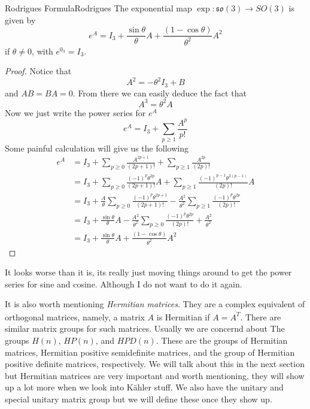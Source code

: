 \begin{boxprop}{Rodrigues Formula}{Rodrigues}
    The exponential map $\exp : \mathfrak{so}(3) \to SO(3)$ is given by
    \begin{equation*}
        e^A = I_3 + \frac{\sin \theta}{\theta}A + \frac{(1-\cos \theta)}{\theta^2}A^2
    \end{equation*}
    if $\theta \neq 0$, with $e^{0_3} = I_3$.

    \begin{proof}
        Notice that
        \begin{equation*}
            A^2 = -\theta^2 I_3 + B
        \end{equation*}
        and $AB=BA=0$.
        From there we can easily deduce the fact that
        \begin{equation*}
            A^3 = \theta^2A
        \end{equation*}
        Now we just write the power series for $e^A$
        \begin{equation*}
            e^A = I_3 + \sum_{p \ge 1}\frac{A^p}{p!}
        \end{equation*}
        Some painful calculation will give us the following
        \begin{align*}
            e^A &= I_3 + \sum_{p\ge 0}\frac{A^{2p+1}}{(2p+1)!} + \sum_{p\ge 1}\frac{A^{2p}}{(2p)!}\\
                &= I_3 + \sum_{p\ge 0}\frac{(-1)^p \theta^{2p}}{(2p+1)!}A + \sum_{p\ge 1}\frac{(-1)^{p-1}\theta^{2(p-1)}}{(2p)!}A\\
                &= I_3 + \frac{A}{\theta}\sum_{p\ge 0}\frac{(-1)^p \theta^{2p+1}}{(2p+1)!} - \frac{A^2}{\theta^2}\sum_{p\ge 1}\frac{(-1)^p\theta^{2p}}{(2p)!}\\
                &= I_3 + \frac{\sin\theta}{\theta}A - \frac{A^2}{\theta^2}\sum_{p\ge 0}\frac{(-1)^p\theta^{2p}}{(2p)!} + \frac{A^2}{\theta^2}\\
                &= I_3 + \frac{\sin\theta}{\theta}A + \frac{(1-\cos\theta)}{\theta^2}A^2
        \end{align*}
    \end{proof}
    It looks worse than it is, its really just moving things around to get the power
    series for sine and cosine. Although I do not want to do it again.
\end{boxprop}

It is also worth mentioning \textit{Hermitian matrices}. They are a complex equivalent
of orthogonal matrices, namely, a matrix $A$ is Hermitian if $A = \overline{A^T}$.
There are similar matrix groups for such matrices. Usually we are concernd about The
groups $H(n)$, $HP(n)$, and $HPD(n)$. These are the groups of Hermitian matrices,
Hermitian positive semidefinite matrices, and the group of Hermitian positive definite
matrices, respectively. We will talk about this in the next section but Hermitian
matrices are very important and worth mentioning, they will show up a lot more when
we look into K\"{a}hler stuff. We also have the unitary and special unitary matrix
group but we will define these once they show up.

